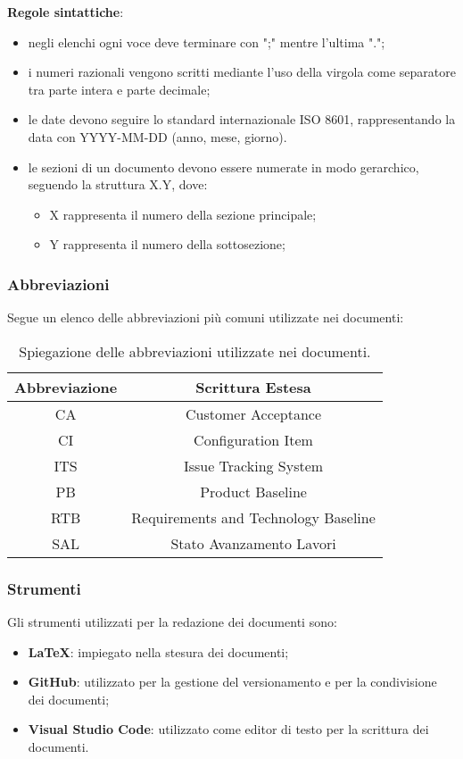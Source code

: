 \newpage
\textbf{Regole sintattiche}:
\begin{itemize}
	\item negli elenchi ogni voce deve terminare con ";" mentre l'ultima ".";
	\item i numeri razionali vengono scritti mediante l'uso della virgola come separatore tra parte intera e parte decimale;
	\item le date devono seguire lo standard internazionale ISO 8601, rappresentando la data con YYYY-MM-DD (anno, mese, giorno).
	\item le sezioni di un documento devono essere numerate in modo gerarchico, seguendo la struttura X.Y, dove:
	      \begin{itemize}
		      \item X rappresenta il numero della sezione principale;
		      \item Y rappresenta il numero della sottosezione;
	      \end{itemize}
\end{itemize}

\subsubsection{Abbreviazioni}
Segue un elenco delle abbreviazioni più comuni utilizzate nei documenti:
\begin{table}[!h]
	\centering
	\begin{tabular}{|c|c|}
		\hline
		\textbf{Abbreviazione} & \textbf{Scrittura Estesa}            \\
		\hline
		CA                     & Customer Acceptance                  \\
		CI                     & Configuration Item                   \\
		ITS                    & Issue Tracking System                \\
		PB                     & Product Baseline                     \\
		RTB                    & Requirements and Technology Baseline \\
		SAL                    & Stato Avanzamento Lavori             \\
		\hline
	\end{tabular}
	\caption{Spiegazione delle abbreviazioni utilizzate nei documenti.}
\end{table}

\subsubsection{Strumenti}
Gli strumenti utilizzati per la redazione dei documenti sono:
\begin{itemize}
	\item \textbf{LaTeX}: impiegato nella stesura dei documenti;
	\item \textbf{GitHub}: utilizzato per la gestione del versionamento e per la condivisione dei documenti;
	\item \textbf{Visual Studio Code}: utilizzato come editor di testo per la scrittura dei documenti.
\end{itemize}

